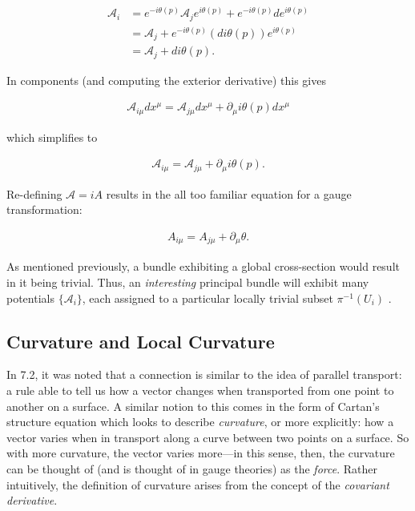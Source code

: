 \documentclass[fleqn, twocolumn, 10pt]{article}
\begin{document}
\begin{ceqn}
\begin{align*}
\mathcal{A}_i &= e^{-i\theta(p)}\mathcal{A}_je^{i\theta(p)} + e^{-i\theta(p)}de^{i\theta(p)}\\ 
&= \mathcal{A}_j + e^{-i\theta(p)}(di\theta(p))e^{i\theta(p)}\\
&= \mathcal{A}_j + di\theta(p).
\end{align*}
\end{ceqn}  
In components (and computing the exterior derivative) this gives

\begin{ceqn}
\begin{align*}
\mathcal{A}_{i\mu}dx^\mu= \mathcal{A}_{j\mu}dx^\mu + \partial_\mu i\theta(p)dx^\mu  
\end{align*}
\end{ceqn}  
which simplifies to

\begin{ceqn}
\begin{align*}
\mathcal{A}_{i\mu}= \mathcal{A}_{j\mu} + \partial_\mu i\theta(p).
\end{align*}
\end{ceqn}  
Re-defining $\mathcal{A} = iA$ results in the all too familiar equation for a gauge transformation:

\begin{ceqn}
\begin{align*}
A_{i\mu}= A_{j\mu} + \partial_\mu \theta.
\end{align*}
\end{ceqn}

As mentioned previously, a bundle exhibiting a global cross-section would result in it being trivial. Thus, an \textit{interesting} principal bundle will exhibit many potentials $\{\mathcal{A}_i\}$, each assigned to a particular locally trivial subset $\pi^{-1}(U_i)$ \cite{nakahara2003geometry}.


\subsection{Curvature and Local Curvature}

In 7.2, it was noted that a connection is similar to the idea of parallel transport: a rule able to tell us how a vector changes when transported from one point to another on a surface. A similar notion to this comes in the form of Cartan's structure equation which looks to describe \textit{curvature}, or more explicitly: how a vector varies when in transport along a curve between two points on a surface. So with more curvature, the vector varies more---in this sense, then, the curvature can be thought of (and is thought of in gauge theories) as the \textit{force}. Rather intuitively, the definition of curvature arises from the concept of the \textit{covariant derivative}.
\end{document}
